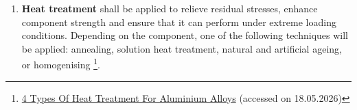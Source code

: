 \begin{enumerate}
    
    \item \textbf{Heat treatment} shall be applied to relieve residual stresses, enhance component strength and ensure that it can perform under extreme loading conditions. Depending on the component, one of the following techniques will be applied: annealing, solution heat treatment, natural and artificial ageing, or homogenising \footnote{\href{https://alloyheat.co.uk/4-types-of-heat-treatment-for-aluminium-alloys/}{4 Types Of Heat Treatment For Aluminium Alloys} (accessed on 18.05.2026)}.
    

\end{enumerate}
